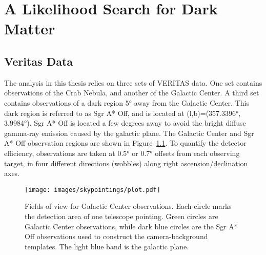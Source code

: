 \cleartooddpage[\thispagestyle{empty}]
\newcommand{\Like}{L}
\newcommand{\LogLike}{\mathcal{L}}
\newcommand{\LogLikeMax}{\LogLike_{\textrm{max}}}
\newcommand{\xtrue}{\mathbf{x }}
\newcommand{\xdet }{\mathbf{x'}}
\newcommand{\ltrue}{\mathbf{l }}
\newcommand{\ldet }{\mathbf{l'}}
\newcommand{\btrue}{\mathbf{b }}
\newcommand{\bdet }{\mathbf{b'}}
\newcommand{\Etrue}{\mathbf{E }}
\newcommand{\Edet }{\mathbf{E'}}
\newcommand{\ttrue}{\mathbf{t }}
\newcommand{\tdet }{\mathbf{t'}}
\newcommand{\Aeff }{A_\textrm{eff }}
\newcommand{\Edisp}{E_\textrm{disp}}
\newcommand{\Mnull}{M_\textrm{null}}
\newcommand{\Malt }{M_\textrm{alt }}

\chapter{A Likelihood Search for Dark Matter}\label{chapter:analysis}

\section{Veritas Data}\label{veritasdata}
  The analysis in this thesis relies on three sets of VERITAS data.
  One set contains observations of the Crab Nebula, and another of the Galactic Center.
  A third set contains observations of a dark region \nicetilde\ang{5} away from the Galactic Center.
  This dark region is referred to as  Sgr A* Off, and is located at (l,b)=(\ang{357.3396}, \ang{3.9984}).
  Sgr A* Off is located a few degrees away to avoid the bright diffuse gamma-ray emission caused by the galactic plane.
  The Galactic Center and Sgr A* Off observation regions are shown in Figure~\ref{fig:gcfieldsofview}.
  To quantify the detector efficiency, observations are taken at \ang{0.5} or \ang{0.7} offsets from each observing target, in four different directions (wobbles) along right ascension/declination axes.

  \begin{figure}[!ht]
    \centering
    \texttt{[image: images/skypointings/plot.pdf]}
    \caption[VERITAS Galactic Center Pointings]{
      Fields of view for Galactic Center observations.
      Each circle marks the detection area of one telescope pointing.
      Green circles are Galactic Center observations, while dark blue circles are the Sgr A* Off observations used to construct the camera-background templates.
      The light blue band is the galactic plane.
    }
    \label{fig:gcfieldsofview}
  \end{figure}

